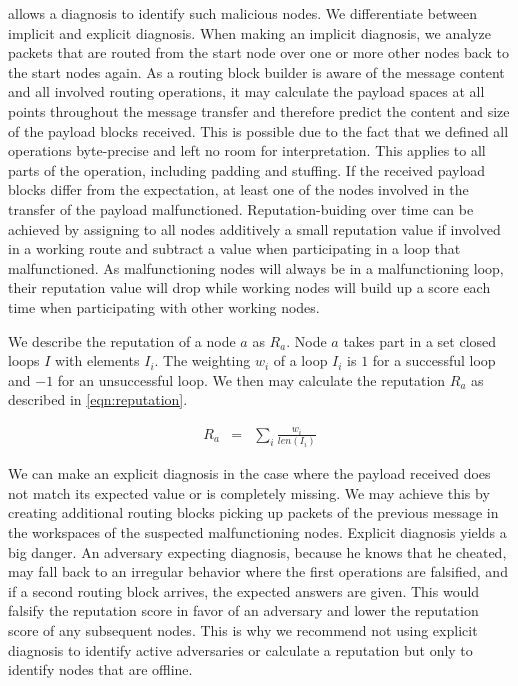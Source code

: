 \MessageVortex{} allows a diagnosis to identify such malicious nodes. We differentiate between implicit and explicit diagnosis. When making an implicit diagnosis, we analyze packets that are routed from the start node over one or more other nodes back to the start nodes again. As a routing block builder is aware of the message content and all involved routing operations, it may calculate the payload spaces at all points throughout the message transfer and therefore predict the content and size of the payload blocks received. This is possible due to the fact that we defined all operations byte-precise and left no room for interpretation. This applies to all parts of the operation, including padding and stuffing. If the received payload blocks differ from the expectation, at least one of the nodes involved in the transfer of the payload malfunctioned. Reputation-buiding over time can be achieved by assigning to all nodes additively a small reputation value if involved in a working route and subtract a value when participating in a loop that malfunctioned. As malfunctioning nodes will always be in a malfunctioning loop, their reputation value will drop while working nodes will build up a score each time when participating with other working nodes.

We describe the reputation of a node $a$ as $R_a$. Node $a$ takes part in a set closed loops $I$ with elements $I_i$. The weighting $w_i$ of a loop $I_i$ is $1$ for a successful loop and $-1$ for an unsuccessful loop. We then may calculate the reputation $R_a$ as described in \cref{eqn:reputation}.

\begin{eqnarray}
	R_a & = & \sum_{i}{\frac{w_i}{len\left(I_i\right)}}\label{eqn:reputation}
\end{eqnarray} 

We can make an explicit diagnosis in the case where the payload received does not match its expected value or is completely missing. We may achieve this by creating additional routing blocks picking up packets of the previous message in the workspaces of the suspected malfunctioning nodes. Explicit diagnosis yields a big danger. An adversary expecting diagnosis, because he knows that he cheated, may fall back to an irregular behavior where the first operations are falsified, and if a second routing block arrives, the expected answers are given. This would falsify the reputation score in favor of an adversary and lower the reputation score of any subsequent nodes. This is why we recommend not using explicit diagnosis to identify active adversaries or calculate a reputation but only to identify nodes that are offline.

